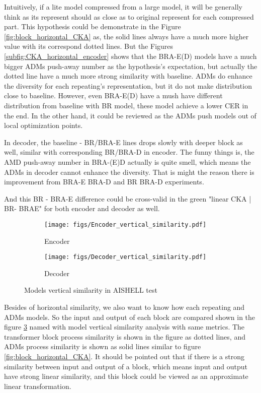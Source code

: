\documentclass{INTERSPEECH2023}
\begin{document}
Intuitively, if a lite model compressed from a large model, it will be generally think as its represent should as close as to original represent for each compressed part. This hypothesis could be demonstrate in the Figure \ref{fig:block_horizontal_CKA} as, the solid lines always have a much more higher value with its correspond dotted lines. But the Figures \ref{subfig:CKA_horizontal_encoder} shows that the BRA-E(D) models have a much bigger ADMs push-away number as the hypothesis's expectation, but actually the dotted line have a much more strong similarity with baseline. ADMs do enhance the diversity for each repeating's representation, but it do not make distribution close to baseline. However, even BRA-E(D) have a mush have different distribution from baseline with BR model, these model achieve a lower CER in the end. In the other hand, it could be reviewed as the ADMs push models out of local optimization points. 


In decoder, the baseline - BR/BRA-E lines drops slowly with deeper block as well, similar with corresponding BR/BRA-D in encoder. The funny things is, the AMD push-away number in BRA-(E)D actually is quite smell, which means the ADMs in decoder cannot enhance the diversity. That is might the reason there is improvement from BRA-E  BRA-D
 and BR  BRA-D experiments.
 

And this BR - BRA-E difference could be cross-valid in the green "linear CKA | BR- BRAE" for both encoder and decoder as well.

\begin{figure}[t!]
    \centering
    \begin{subfigure}[b]{0.45\textwidth}
         \centering
         \texttt{[image: figs/Encoder\_vertical\_similarity.pdf]}
         \caption{Encoder} \label{subfig:CKA_vertical_encoder}
    \end{subfigure}
    \hfill
    \begin{subfigure}[b]{0.45\textwidth}
         \centering
         \texttt{[image: figs/Decoder\_vertical\_similarity.pdf]}
         \caption{Decoder} \label{subfig:CKA_vertical_decoder}
    \end{subfigure}
    \caption{Models vertical similarity in AISHELL test}
    \label{fig:block_vertical_CKA}
\end{figure}

Besides of horizontal similarity, we also want to know how each repeating and ADMs models. So the input and output of each block are compared shown in the figure \ref{fig:block_vertical_CKA} named with model vertical similarity analysis with same metrics. The transformer block process similarity is shown in the figure as dotted lines, and ADMs process similarity is shown as solid lines similar to figure \ref{fig:block_horizontal_CKA}. It should be pointed out that if there is a strong similarity between input and output of a block, which means input and output have strong linear similarity, and this block could be viewed as an approximate linear transformation.
\end{document}
